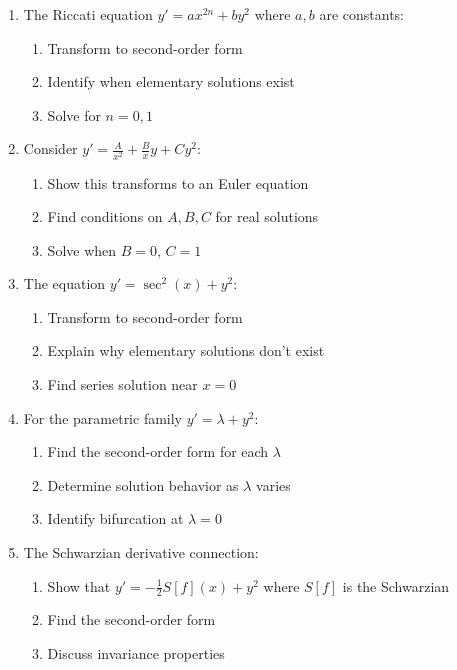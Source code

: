 \documentclass[12pt]{article}
\begin{document}
\begin{enumerate}[resume]
    \item The Riccati equation $y' = ax^{2n} + by^2$ where $a, b$ are constants:
    \begin{enumerate}[label=(\alph*)]
        \item Transform to second-order form
        \item Identify when elementary solutions exist
        \item Solve for $n = 0, 1$
    \end{enumerate}

    \item Consider $y' = \frac{A}{x^2} + \frac{B}{x}y + Cy^2$:
    \begin{enumerate}[label=(\alph*)]
        \item Show this transforms to an Euler equation
        \item Find conditions on $A, B, C$ for real solutions
        \item Solve when $B = 0$, $C = 1$
    \end{enumerate}

    \item The equation $y' = \sec^2(x) + y^2$:
    \begin{enumerate}[label=(\alph*)]
        \item Transform to second-order form
        \item Explain why elementary solutions don't exist
        \item Find series solution near $x = 0$
    \end{enumerate}

    \item For the parametric family $y' = \lambda + y^2$:
    \begin{enumerate}[label=(\alph*)]
        \item Find the second-order form for each $\lambda$
        \item Determine solution behavior as $\lambda$ varies
        \item Identify bifurcation at $\lambda = 0$
    \end{enumerate}

    \item The Schwarzian derivative connection:
    \begin{enumerate}[label=(\alph*)]
        \item Show that $y' = -\frac{1}{2}S[f](x) + y^2$ where $S[f]$ is the Schwarzian
        \item Find the second-order form
        \item Discuss invariance properties
    \end{enumerate}
\end{enumerate}
\end{document}

